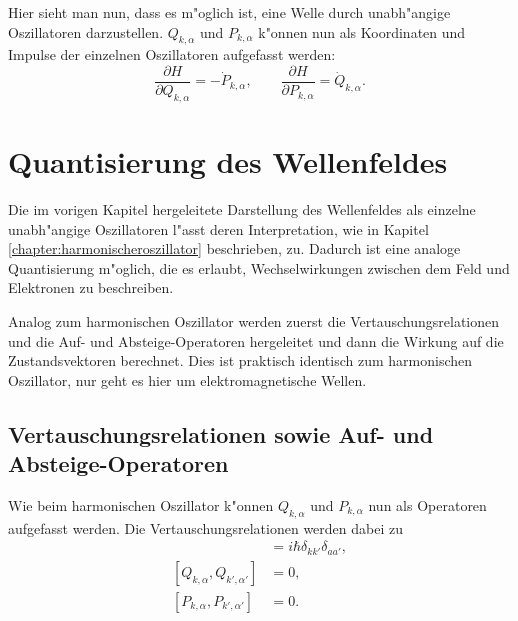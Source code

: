 \begin{refsection}
Hier sieht man nun, dass es m"oglich ist, eine Welle durch unabh"angige Oszillatoren darzustellen.
$Q_{k,\alpha}$ und $P_{k,\alpha}$ k"onnen nun als Koordinaten und Impulse der einzelnen Oszillatoren aufgefasst werden:
\begin{equation*}
\dfrac{\partial H}{\partial Q_{k,\alpha}} = -\dot{P}_{k,\alpha}, \qquad \dfrac{\partial H}{\partial P_{k,\alpha}} = \dot{Q}_{k,\alpha}.
\end{equation*}

\section{Quantisierung des Wellenfeldes}

Die im vorigen Kapitel hergeleitete Darstellung des Wellenfeldes als einzelne unabh"angige Oszillatoren l"asst deren Interpretation, wie in Kapitel \ref{chapter:harmonischeroszillator} beschrieben, zu. Dadurch ist eine analoge Quantisierung m"oglich, die es erlaubt, Wechselwirkungen zwischen dem Feld und Elektronen zu beschreiben.

Analog zum harmonischen Oszillator werden zuerst die Vertauschungsrelationen und die Auf- und Absteige-Operatoren hergeleitet und dann die Wirkung auf die Zustandsvektoren berechnet. Dies ist praktisch identisch zum harmonischen Oszillator, nur geht es hier um elektromagnetische Wellen.

\subsection{Vertauschungsrelationen sowie Auf- und Absteige-Operatoren}
Wie beim harmonischen Oszillator k"onnen $Q_{k,\alpha}$ und $P_{k,\alpha}$ nun als Operatoren aufgefasst werden. Die Vertauschungsrelationen werden dabei zu
\begin{align*}
[Q_{k,\alpha}, P_{k',\alpha'}] &= i \hbar \delta_{kk'}\delta_{aa'}, \\
[Q_{k,\alpha}, Q_{k',\alpha'}] &= 0, \\
[P_{k,\alpha}, P_{k',\alpha'}] &= 0.
\end{align*}


\end{refsection}
